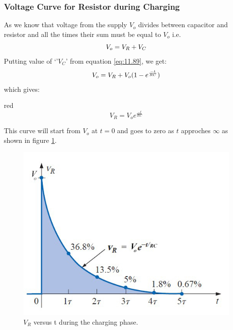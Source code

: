 \subsubsection{Voltage Curve for Resistor during Charging}
As we know that voltage from the supply $V_{o}$ divides between capacitor and
resistor and all the times their sum must be equal to $V_{o}$ i.e.
\begin{equation}\notag
  V_{o} = V_{R} + V_{C}
\end{equation}
Putting value of `'$V_{C}$' from equation \ref{eq:11.89}, we get:
\begin{equation}\notag
  V_{o} = V_{R} + V_{o}(1-e^{\frac{-t}{RC}})
\end{equation}
which gives:
\begin{mybox}{red}{}
\begin{equation}\label{eq:11.90}
  V_{R} = V_{o}e^{\frac{-t}{RC}}
\end{equation}
\end{mybox}
This curve will start from $V_{o}$ at $t = 0$ and goes to zero as $t$ approches $\infty$
as shown in figure \ref{fig:11.39}.
\begin{figure}[H]
  \centering
  \includegraphics[scale = 0.4]{Images/Chapter-11/11.40}
  \caption{$V_R$ versus t during the charging phase.}
  \label{fig:11.39}
\end{figure}
